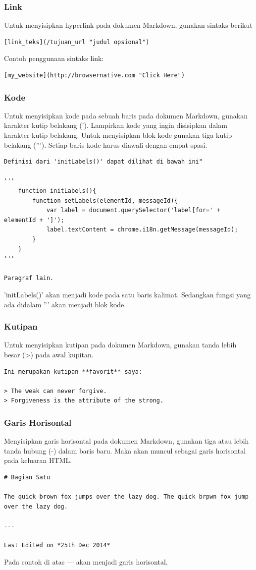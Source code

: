 \subsubsection{Link}
Untuk menyisipkan hyperlink pada dokumen Markdown, gunakan sintaks berikut 
\begin{lstlisting}
[link_teks](/tujuan_url "judul opsional")
\end{lstlisting}
Contoh penggunaan sintaks link:
\begin{lstlisting}
[my_website](http://browsernative.com "Click Here")
\end{lstlisting}

\subsubsection{Kode}
Untuk menyisipkan kode pada sebuah baris pada dokumen Markdown, gunakan karakter kutip belakang ('). Lampirkan kode yang ingin disisipkan dalam karakter kutip belakang. Untuk menyisipkan blok kode gunakan tiga kutip belakang ('''). Setiap baris kode harus diawali dengan empat spasi.
\begin{lstlisting}
Definisi dari 'initLabels()' dapat dilihat di bawah ini"

'''
    function initLabels(){
        function setLabels(elementId, messageId){
            var label = document.querySelector('label[for=' + elementId + ']');
            label.textContent = chrome.i18n.getMessage(messageId);
        }
    }
'''

Paragraf lain.
\end{lstlisting}
'initLabels()' akan menjadi kode pada satu baris kalimat. Sedangkan fungsi yang ada didalam ''' akan menjadi blok kode.

\subsubsection{Kutipan}
Untuk menyisipkan kutipan pada dokumen Markdown, gunakan tanda lebih besar (>) pada awal kupitan.
\begin{lstlisting}
Ini merupakan kutipan **favorit** saya:

> The weak can never forgive.
> Forgiveness is the attribute of the strong.
\end{lstlisting}

\subsubsection{Garis Horisontal}
Menyisipkan garis horisontal pada dokumen Markdown, gunakan tiga atau lebih tanda hubung (-) dalam baris baru. Maka akan muncul sebagai garis horisontal pada keluaran HTML.
\begin{lstlisting}
# Bagian Satu

The quick brown fox jumps over the lazy dog. The quick brpwn fox jump over the lazy dog.

---

Last Edited on *25th Dec 2014*
\end{lstlisting}
Pada contoh di atas --- akan menjadi garis horisontal.

